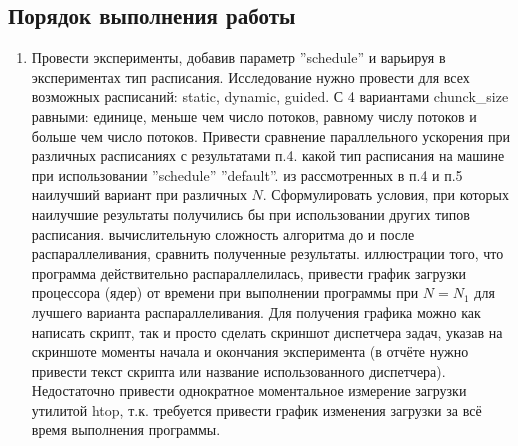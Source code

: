 \subsection{Порядок выполнения работы}
\begin{enumerate}
     во все for-циклы (кроме цикла в функции main, указывающего количество экспериментов) в программе из ЛР №1 следующую директиву OpenMP:   Наличие параметра default(none) является обязательным.
     все for-циклы на внутренние зависимости по данным между итерациями. Если зависимости обнаружились, использовать для защиты критических секций директиву ''\#pragma omp critical'' или ''\#pragma omp atomic'' (если операция атомарна), или параметр reduction (предпочтительнее) или вообще отказаться от распараллеливания цикла (свой выбор необходимо обосновать).
    , что получившаяся программа обладает свойством прямой совместимости с компиляторами, не поддерживающими \\OpenMP (для проверки этого можно скомпилировать программу без опции ''–fopenmp'', в результате не должно быть сообщений об ошибках, а программа должна корректно работать).
     функцию SetNumThreads для изменения числа потоков. В отчете указать максимальное количество потоков.
     эксперименты, замеряя параллельное ускорение. Привести сравнение графиков параллельного ускорения с ЛР №1 и ЛР №2.
    \item Провести эксперименты, добавив параметр ''schedule'' и варьируя в экспериментах тип расписания. Исследование нужно провести для всех возможных расписаний: static, dynamic, guided. С 4 вариантами chunck\_size равными: единице, меньше чем число потоков, равному числу потоков и больше чем число потоков. Привести сравнение параллельного ускорения при различных расписаниях с результатами п.4.
     какой тип расписания на машине при использовании ''schedule'' ''default''.
     из рассмотренных в п.4 и п.5 наилучший вариант при различных $N$. Сформулировать условия, при которых наилучшие результаты получились бы при использовании других типов расписания.
     вычислительную сложность алгоритма до и после распараллеливания, сравнить полученные результаты.
     иллюстрации того, что программа действительно распараллелилась, привести график загрузки процессора (ядер) от времени при выполнении программы при $N = N_1$ для лучшего варианта распараллеливания. Для получения графика можно как написать скрипт, так и просто сделать скриншот диспетчера задач, указав на скриншоте моменты начала и окончания эксперимента (в отчёте нужно привести текст скрипта или название использованного диспетчера). Недостаточно привести однократное моментальное измерение загрузки утилитой htop, т.к. требуется привести график изменения загрузки за всё время выполнения программы.

\end{enumerate}

